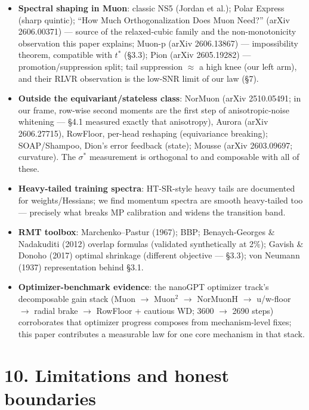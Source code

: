 \documentclass[
]{article}
\providecommand{\tightlist}{%
  \setlength{\itemsep}{0pt}\setlength{\parskip}{0pt}}
\begin{document}
\begin{itemize}
\tightlist
\item
  \textbf{Spectral shaping in Muon}: classic NS5 (Jordan et al.); Polar
  Express (sharp quintic); ``How Much Orthogonalization Does Muon
  Need?'' (arXiv 2606.00371) --- source of the relaxed-cubic family and
  the non-monotonicity observation this paper explains; Muon-p (arXiv
  2606.13867) --- impossibility theorem, compatible with \(t^*\) (§3.3);
  Pion (arXiv 2605.19282) --- promotion/suppression split; tail
  suppression \(\approx\) a high knee (our left arm), and their RLVR
  observation is the low-SNR limit of our law (§7).
\item
  \textbf{Outside the equivariant/stateless class}: NorMuon (arXiv
  2510.05491; in our frame, row-wise second moments are the first step
  of anisotropic-noise whitening --- §4.1 measured exactly that
  anisotropy), Aurora (arXiv 2606.27715), RowFloor, per-head reshaping
  (equivariance breaking); SOAP/Shampoo, Dion's error feedback (state);
  Mousse (arXiv 2603.09697; curvature). The \(\sigma^*\) measurement is
  orthogonal to and composable with all of these.
\item
  \textbf{Heavy-tailed training spectra}: HT-SR-style heavy tails are
  documented for weights/Hessians; we find momentum spectra are smooth
  heavy-tailed too --- precisely what breaks MP calibration and widens
  the transition band.
\item
  \textbf{RMT toolbox}: Marchenko--Pastur (1967); BBP; Benaych-Georges
  \& Nadakuditi (2012) overlap formulas (validated synthetically at
  2\%); Gavish \& Donoho (2017) optimal shrinkage (different objective
  --- §3.3); von Neumann (1937) representation behind §3.1.
\item
  \textbf{Optimizer-benchmark evidence}: the nanoGPT optimizer track's
  decomposable gain stack (Muon \(\to\) Muon\(^2\) \(\to\) NorMuonH
  \(\to\) u/w-floor \(\to\) radial brake \(\to\) RowFloor + cautious WD;
  3600 \(\to\) 2690 steps) corroborates that optimizer progress composes
  from mechanism-level fixes; this paper contributes a measurable law
  for one core mechanism in that stack.
\end{itemize}

\section{10. Limitations and honest
boundaries}\label{limitations-and-honest-boundaries}
\end{document}
